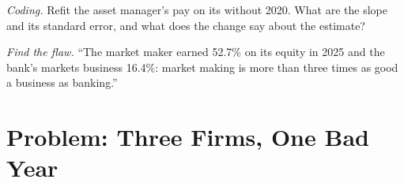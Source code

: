 \begin{exercise}[$\star\star\star$]\label{exo:fm:the-economics-of-a-trading-firm:7}
\emph{Coding.} Refit the asset manager's pay on its  without 2020. What are the slope and its standard error, and what does the
change say about the estimate?
\end{exercise}

\begin{exercise}[$\star\star\star$]\label{exo:fm:the-economics-of-a-trading-firm:8}
\emph{Find the flaw.} ``The market maker earned 52.7\% on its equity in 2025 and the bank's markets business 16.4\%: market making is more than
three times as good a business as banking.''
\end{exercise}

\section{Problem: Three Firms, One Bad Year}

